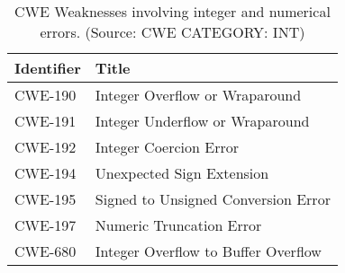\begin{table}
	\centering
	\caption{CWE Weaknesses involving integer and numerical errors. (Source: CWE CATEGORY: INT)}
	\label{table:cwe_integers}
	\begin{tabular}{ll}
		\toprule
			\textbf{Identifier} & \textbf{Title}\\
		\midrule
			CWE-190 & Integer Overflow or Wraparound\\
			CWE-191 & Integer Underflow or Wraparound\\
			CWE-192 & Integer Coercion Error\\
			CWE-194 & Unexpected Sign Extension\\
			CWE-195 & Signed to Unsigned Conversion Error\\
			CWE-197 & Numeric Truncation Error\\
			CWE-680 & Integer Overflow to Buffer Overflow\\
		\bottomrule
	\end{tabular}
\end{table}